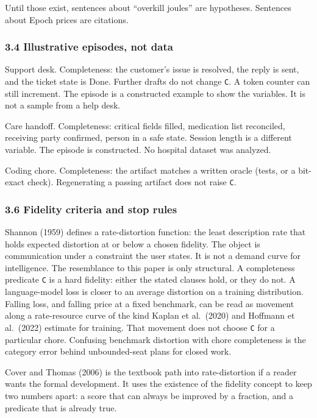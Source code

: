 \documentclass[
  10pt,
]{article}
\begin{document}
Until those exist, sentences about ``overkill joules'' are hypotheses.
Sentences about Epoch prices are citations.

\subsubsection{3.4 Illustrative episodes, not
data}\label{illustrative-episodes-not-data}

Support desk. Completeness: the customer's issue is resolved, the reply
is sent, and the ticket state is Done. Further drafts do not change
\texttt{C}. A token counter can still increment. The episode is a
constructed example to show the variables. It is not a sample from a
help desk.

Care handoff. Completeness: critical fields filled, medication list
reconciled, receiving party confirmed, person in a safe state. Session
length is a different variable. The episode is constructed. No hospital
dataset was analyzed.

Coding chore. Completeness: the artifact matches a written oracle
(tests, or a bit-exact check). Regenerating a passing artifact does not
raise \texttt{C}.

\subsubsection{3.6 Fidelity criteria and stop
rules}\label{fidelity-criteria-and-stop-rules}

Shannon (1959) defines a rate-distortion function: the least description
rate that holds expected distortion at or below a chosen fidelity. The
object is communication under a constraint the user states. It is not a
demand curve for intelligence. The resemblance to this paper is only
structural. A completeness predicate \texttt{C} is a hard fidelity:
either the stated clauses hold, or they do not. A language-model loss is
closer to an average distortion on a training distribution. Falling
loss, and falling price at a fixed benchmark, can be read as movement
along a rate-resource curve of the kind Kaplan et al.~(2020) and
Hoffmann et al.~(2022) estimate for training. That movement does not
choose \texttt{C} for a particular chore. Confusing benchmark distortion
with chore completeness is the category error behind unbounded-seat
plans for closed work.

Cover and Thomas (2006) is the textbook path into rate-distortion if a
reader wants the formal development. It uses the existence of the
fidelity concept to keep two numbers apart: a score that can always be
improved by a fraction, and a predicate that is already true.
\end{document}
